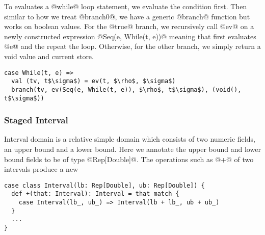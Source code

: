 To evaluates a @while@ loop statement, we evaluate the condition first.
Then similar to how we treat @branch0@, we have a generic @branch@ function but works on boolean
values. For the @true@ branch, we recursively call @ev@ on a newly constructed expression
@Seq(e, While(t, e))@ meaning that first evaluates @e@ and the repeat the loop.
Otherwise, for the other branch, we simply return a void value and current store.

\begin{lstlisting}
case While(t, e) =>
  val (tv, t$\sigma$) = ev(t, $\rho$, $\sigma$)
  branch(tv, ev(Seq(e, While(t, e)), $\rho$, t$\sigma$), (void(), t$\sigma$))
\end{lstlisting}

\subsubsection{Staged Interval}

Interval domain is a relative simple domain which consists of two numeric fields, an upper bound 
and a lower bound. Here we annotate the upper bound and lower bound fields to be of type @Rep[Double]@.
The operations such as @+@ of two intervals produce a new 

\begin{lstlisting}
case class Interval(lb: Rep[Double], ub: Rep[Double]) {
  def +(that: Interval): Interval = that match {
    case Interval(lb_, ub_) => Interval(lb + lb_, ub + ub_)
  }
  ...
}
\end{lstlisting}

